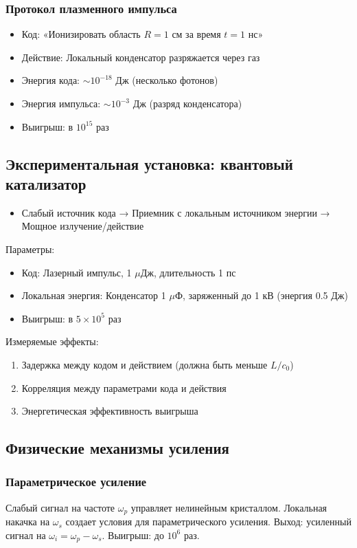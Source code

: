 \documentclass[11pt,a4paper]{article}
\begin{document}
	\subsubsection{Протокол плазменного импульса}
	\begin{itemize}
		\item Код: «Ионизировать область $R=1$ см за время $t=1$ нс»
		\item Действие: Локальный конденсатор разряжается через газ
		\item Энергия кода: $\sim 10^{-18}$ Дж (несколько фотонов)
		\item Энергия импульса: $\sim 10^{-3}$ Дж (разряд конденсатора)
		\item Выигрыш: в $10^{15}$ раз
	\end{itemize}
	
	\subsection{Экспериментальная установка: квантовый катализатор}
	
	\begin{itemize}
		\item Слабый источник кода → Приемник с локальным источником энергии → Мощное излучение/действие
	\end{itemize}
	
	Параметры:
	\begin{itemize}
		\item Код: Лазерный импульс, 1 $\mu$Дж, длительность 1 пс
		\item Локальная энергия: Конденсатор 1 $\mu$Ф, заряженный до 1 кВ (энергия 0.5 Дж)
		\item Выигрыш: в $5 \times 10^5$ раз
	\end{itemize}
	
	Измеряемые эффекты:
	\begin{enumerate}
		\item Задержка между кодом и действием (должна быть меньше $L/c_0$)
		\item Корреляция между параметрами кода и действия
		\item Энергетическая эффективность выигрыша
	\end{enumerate}
	
	\subsection{Физические механизмы усиления}
	
	\subsubsection{Параметрическое усиление}
	Слабый сигнал на частоте $\omega_p$ управляет нелинейным кристаллом. Локальная накачка на $\omega_s$ создает условия для параметрического усиления. Выход: усиленный сигнал на $\omega_i = \omega_p - \omega_s$. Выигрыш: до $10^6$ раз.
	
\end{document}
